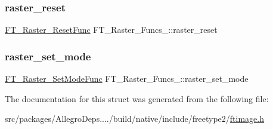 \mbox{\label{struct_f_t___raster___funcs___a91e9decd6066090a5f306f33f9815d39}} 
\subsubsection{\texorpdfstring{raster\+\_\+reset}{raster\_reset}}
{\footnotesize\ttfamily \hyperlink{ftimage_8h_a0ae680a37517fe355321f780123d12f6}{F\+T\+\_\+\+Raster\+\_\+\+Reset\+Func} F\+T\+\_\+\+Raster\+\_\+\+Funcs\+\_\+\+::raster\+\_\+reset}

\mbox{\label{struct_f_t___raster___funcs___a3b37c781e54cf933cb60f57f2d45b32c}} 
\subsubsection{\texorpdfstring{raster\+\_\+set\+\_\+mode}{raster\_set\_mode}}
{\footnotesize\ttfamily \hyperlink{ftimage_8h_a959011dc7420bae5989460bfd0727bd1}{F\+T\+\_\+\+Raster\+\_\+\+Set\+Mode\+Func} F\+T\+\_\+\+Raster\+\_\+\+Funcs\+\_\+\+::raster\+\_\+set\+\_\+mode}



The documentation for this struct was generated from the following file\+:\begin{DoxyCompactItemize}
\item 
src/packages/\+Allegro\+Deps..../build/native/include/freetype2/\hyperlink{ftimage_8h}{ftimage.\+h}\end{DoxyCompactItemize}
